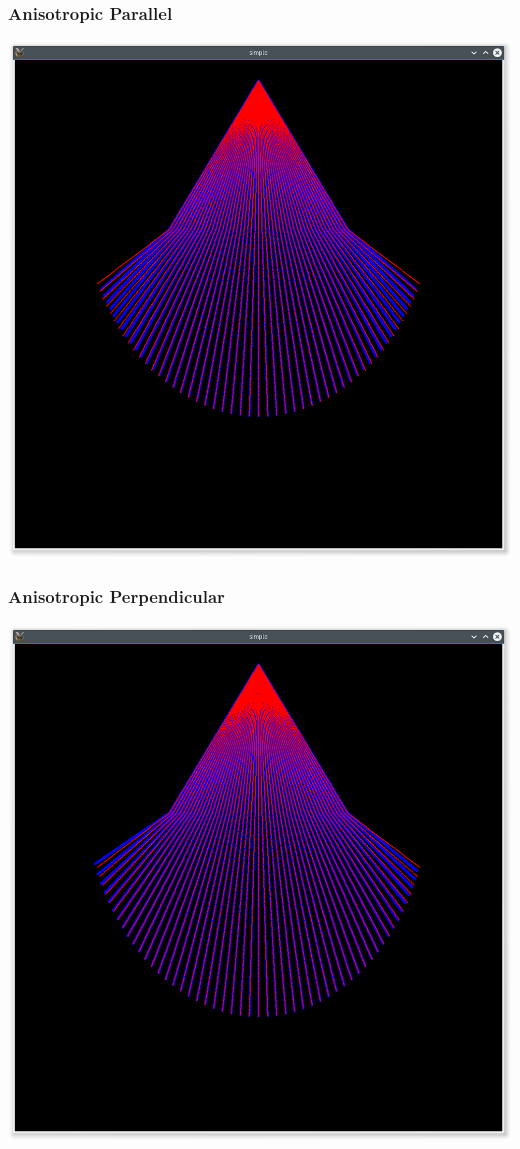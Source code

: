 \documentclass{beamer}
\begin{document}
\begin{frame}
\frametitle{Anisotropic Parallel}

\includegraphics[width=\textwidth]{elliptical_parallel_nu.png}

\end{frame}

\begin{frame}
\frametitle{Anisotropic Perpendicular}

\includegraphics[width=\textwidth]{elliptical_orthogonal_nu.png}

\end{frame}
\end{document}
